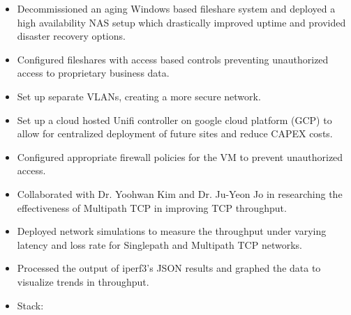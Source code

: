 \begin{itemize}
    \item Decommissioned an aging Windows based fileshare system and deployed a high availability NAS setup which drastically improved uptime and provided disaster recovery options.
    \item Configured fileshares with access based controls preventing unauthorized access to proprietary business data.
    \item Set up separate VLANs, creating a more secure network.
    \item Set up a cloud hosted Unifi controller on google cloud platform (GCP) to allow for centralized deployment of future sites and reduce CAPEX costs.
    \item Configured appropriate firewall policies for the VM to prevent unauthorized access.
\end{itemize}
\divider


\begin{itemize}
    \item Collaborated with Dr. Yoohwan Kim and Dr. Ju-Yeon Jo in researching the effectiveness of Multipath TCP in improving TCP throughput.
    \item Deployed network simulations to measure the throughput under varying latency and loss rate for Singlepath and Multipath TCP networks.
    \item Processed the output of iperf3's JSON results and graphed the data to visualize trends in throughput.
    \item Stack:    
\end{itemize}
\divider


